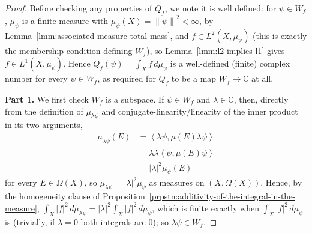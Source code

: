 \begin{proof}
    \leanok
Before checking any properties of $Q_f$, we note it is well defined: for $\psi \in W_f$, $\mu_\psi$ is a finite measure with $\mu_\psi(X) = \left\| \psi \right\|^2 < \infty$, by Lemma~\ref{lmm:associated-measure-total-mass}, and $f \in L^2(X,\mu_\psi)$ (this is exactly the membership condition defining $W_f$), so Lemma~\ref{lmm:l2-implies-l1} gives $f \in L^1(X,\mu_\psi)$. Hence $Q_f(\psi) = \int_X f \, d\mu_\psi$ is a well-defined (finite) complex number for every $\psi \in W_f$, as required for $Q_f$ to be a map $W_f \to \mathbb{C}$ at all.

\textbf{Part 1.} We first check $W_f$ is a subspace. If $\psi \in W_f$ and $\lambda \in \mathbb{C}$, then, directly from the definition of $\mu_{\lambda\psi}$ and conjugate-linearity/linearity of the inner product in its two arguments,
\begin{align}
    \mu_{\lambda\psi}(E) &= \left< \lambda\psi, \mu(E)\lambda\psi \right> \\
                &= \overline{\lambda}\lambda \left< \psi, \mu(E)\psi \right> \\
                &= \lvert \lambda \rvert^2 \mu_\psi(E)
\end{align}
for every $E \in \Omega(X)$, so $\mu_{\lambda\psi} = \lvert \lambda \rvert^2 \mu_\psi$ as measures on $(X, \Omega(X))$. Hence, by the homogeneity clause of Proposition~\ref{prpstn:additivity-of-the-integral-in-the-measure}, $\int_X \lvert f \rvert^2 \, d\mu_{\lambda\psi} = \lvert \lambda \rvert^2 \int_X \lvert f \rvert^2 \, d\mu_\psi$, which is finite exactly when $\int_X \lvert f \rvert^2 \, d\mu_\psi$ is (trivially, if $\lambda = 0$ both integrals are $0$); so $\lambda\psi \in W_f$.


\end{proof}
